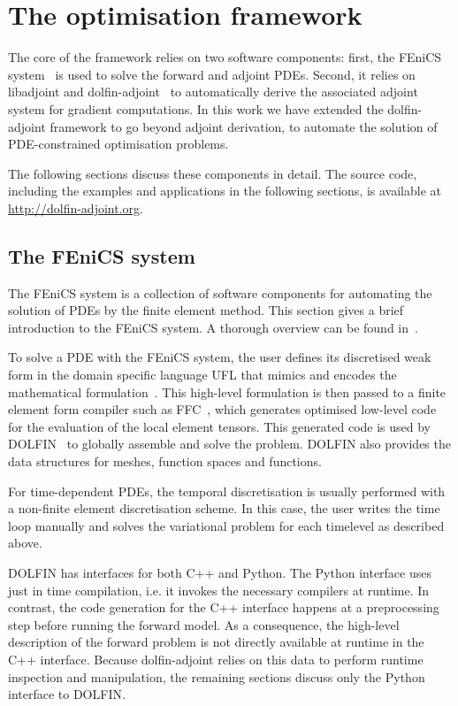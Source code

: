 \documentclass[prodmode,acmtoms]{acmsmall}
\newcommand{\fenics}{{\mbox{FEniCS}}\xspace}
\newcommand{\dolfin}{{\mbox{DOLFIN}}\xspace}
\newcommand{\da}{\mbox{{dolfin-adjoint}}\xspace}
\newcommand{\libadjoint}{\mbox{{libadjoint}}\xspace}
\begin{document}
\section{The optimisation framework}\label{sec:the_optimisation_framework}


The core of the framework relies on two software components: 
first, the \fenics system~\cite{logg2011,logg2007a} is used to solve the forward and adjoint PDEs.
Second, it relies on \libadjoint and \da~\cite{farrell2012} to automatically derive the associated adjoint system for gradient computations.
In this work we have extended the \da framework to go beyond adjoint derivation, to automate the solution of PDE-constrained optimisation problems.

The following sections discuss these components in detail.
The source code, including the examples and applications in the following sections, is available at \url{http://dolfin-adjoint.org}.

\subsection{The \fenics system} \label{sec:fenics}
The \fenics system is a collection of software components for automating
the solution of PDEs by the finite element method.
This section gives a brief introduction to the \fenics system.
A thorough overview can be found in~.

To solve a PDE with the \fenics system, the user defines its discretised weak form in the domain specific language UFL that mimics and encodes the mathematical formulation~\cite{alnaes2011,alnaes2012}.
This high-level formulation is then passed to a finite element form compiler such as FFC~\cite{kirby2006}, which generates optimised low-level code for the 
evaluation of the local element tensors.
This generated code is used by \dolfin~\cite{logg2010a,logg2011a} to globally assemble and solve the problem.
\dolfin also provides the data structures for meshes, function spaces and functions.

For time-dependent PDEs, the temporal discretisation is usually performed with a non-finite element discretisation scheme. 
In this case, the user writes the time loop manually and solves the variational problem for each timelevel as described above. 

\dolfin has interfaces for both C++ and Python.
The Python interface uses just in time compilation, i.e. it invokes the necessary compilers at runtime. 
In contrast, the code generation for the C++ interface happens at a preprocessing step before running the forward model. 
As a consequence, the high-level description of the forward problem is not directly available at runtime in the C++ interface. 
Because \da relies on this data to perform runtime inspection and manipulation, the remaining sections discuss only the Python interface to \dolfin. 
\end{document}
